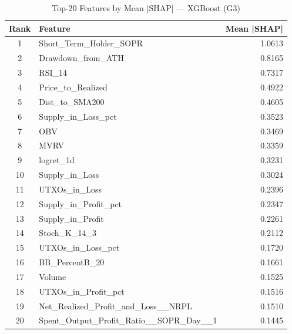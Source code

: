 \begin{table}[htbp]
\centering
\caption{Top-20 Features by Mean |SHAP| — XGBoost (G3)}
\label{tab:fi_XGBoost_G3}
\begin{tabular}{clr}
\toprule
Rank & Feature & Mean |SHAP| \\
\midrule
1 & Short\_Term\_Holder\_SOPR & 1.0613 \\
2 & Drawdown\_from\_ATH & 0.8165 \\
3 & RSI\_14 & 0.7317 \\
4 & Price\_to\_Realized & 0.4922 \\
5 & Dist\_to\_SMA200 & 0.4605 \\
6 & Supply\_in\_Loss\_pct & 0.3523 \\
7 & OBV & 0.3469 \\
8 & MVRV & 0.3359 \\
9 & logret\_1d & 0.3231 \\
10 & Supply\_in\_Loss & 0.3024 \\
11 & UTXOs\_in\_Loss & 0.2396 \\
12 & Supply\_in\_Profit\_pct & 0.2347 \\
13 & Supply\_in\_Profit & 0.2261 \\
14 & Stoch\_K\_14\_3 & 0.2112 \\
15 & UTXOs\_in\_Loss\_pct & 0.1720 \\
16 & BB\_PercentB\_20 & 0.1661 \\
17 & Volume & 0.1525 \\
18 & UTXOs\_in\_Profit\_pct & 0.1516 \\
19 & Net\_Realized\_Profit\_and\_Loss\_\_NRPL & 0.1510 \\
20 & Spent\_Output\_Profit\_Ratio\_\_SOPR\_Day\_\_1 & 0.1445 \\
\bottomrule
\end{tabular}
\end{table}